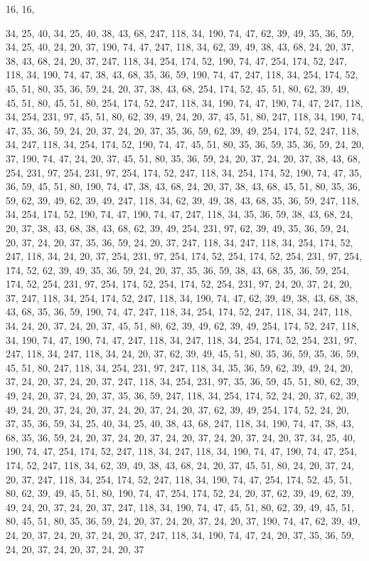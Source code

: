 16, 16,

34, 25, 40, 34, 25, 40, 38, 43, 68, 247, 118, 34, 190, 74, 47, 62,
39, 49, 35, 36, 59, 34, 25, 40, 24, 20, 37, 190, 74, 47, 247, 118,
34, 62, 39, 49, 38, 43, 68, 24, 20, 37, 38, 43, 68, 24, 20, 37,
247, 118, 34, 254, 174, 52, 190, 74, 47, 254, 174, 52, 247, 118, 34, 190,
74, 47, 38, 43, 68, 35, 36, 59, 190, 74, 47, 247, 118, 34, 254, 174,
52, 45, 51, 80, 35, 36, 59, 24, 20, 37, 38, 43, 68, 254, 174, 52,
45, 51, 80, 62, 39, 49, 45, 51, 80, 45, 51, 80, 254, 174, 52, 247,
118, 34, 190, 74, 47, 190, 74, 47, 247, 118, 34, 254, 231, 97, 45, 51,
80, 62, 39, 49, 24, 20, 37, 45, 51, 80, 247, 118, 34, 190, 74, 47,
35, 36, 59, 24, 20, 37, 24, 20, 37, 35, 36, 59, 62, 39, 49, 254,
174, 52, 247, 118, 34, 247, 118, 34, 254, 174, 52, 190, 74, 47, 45, 51,
80, 35, 36, 59, 35, 36, 59, 24, 20, 37, 190, 74, 47, 24, 20, 37,
45, 51, 80, 35, 36, 59, 24, 20, 37, 24, 20, 37, 38, 43, 68, 254,
231, 97, 254, 231, 97, 254, 174, 52, 247, 118, 34, 254, 174, 52, 190, 74,
47, 35, 36, 59, 45, 51, 80, 190, 74, 47, 38, 43, 68, 24, 20, 37,
38, 43, 68, 45, 51, 80, 35, 36, 59, 62, 39, 49, 62, 39, 49, 247,
118, 34, 62, 39, 49, 38, 43, 68, 35, 36, 59, 247, 118, 34, 254, 174,
52, 190, 74, 47, 190, 74, 47, 247, 118, 34, 35, 36, 59, 38, 43, 68,
24, 20, 37, 38, 43, 68, 38, 43, 68, 62, 39, 49, 254, 231, 97, 62,
39, 49, 35, 36, 59, 24, 20, 37, 24, 20, 37, 35, 36, 59, 24, 20,
37, 247, 118, 34, 247, 118, 34, 254, 174, 52, 247, 118, 34, 24, 20, 37,
254, 231, 97, 254, 174, 52, 254, 174, 52, 254, 231, 97, 254, 174, 52, 62,
39, 49, 35, 36, 59, 24, 20, 37, 35, 36, 59, 38, 43, 68, 35, 36,
59, 254, 174, 52, 254, 231, 97, 254, 174, 52, 254, 174, 52, 254, 231, 97,
24, 20, 37, 24, 20, 37, 247, 118, 34, 254, 174, 52, 247, 118, 34, 190,
74, 47, 62, 39, 49, 38, 43, 68, 38, 43, 68, 35, 36, 59, 190, 74,
47, 247, 118, 34, 254, 174, 52, 247, 118, 34, 247, 118, 34, 24, 20, 37,
24, 20, 37, 45, 51, 80, 62, 39, 49, 62, 39, 49, 254, 174, 52, 247,
118, 34, 190, 74, 47, 190, 74, 47, 247, 118, 34, 247, 118, 34, 254, 174,
52, 254, 231, 97, 247, 118, 34, 247, 118, 34, 24, 20, 37, 62, 39, 49,
45, 51, 80, 35, 36, 59, 35, 36, 59, 45, 51, 80, 247, 118, 34, 254,
231, 97, 247, 118, 34, 35, 36, 59, 62, 39, 49, 24, 20, 37, 24, 20,
37, 24, 20, 37, 247, 118, 34, 254, 231, 97, 35, 36, 59, 45, 51, 80,
62, 39, 49, 24, 20, 37, 24, 20, 37, 35, 36, 59, 247, 118, 34, 254,
174, 52, 24, 20, 37, 62, 39, 49, 24, 20, 37, 24, 20, 37, 24, 20,
37, 24, 20, 37, 62, 39, 49, 254, 174, 52, 24, 20, 37, 35, 36, 59,
34, 25, 40, 34, 25, 40, 38, 43, 68, 247, 118, 34, 190, 74, 47, 38,
43, 68, 35, 36, 59, 24, 20, 37, 24, 20, 37, 24, 20, 37, 24, 20,
37, 24, 20, 37, 34, 25, 40, 190, 74, 47, 254, 174, 52, 247, 118, 34,
247, 118, 34, 190, 74, 47, 190, 74, 47, 254, 174, 52, 247, 118, 34, 62,
39, 49, 38, 43, 68, 24, 20, 37, 45, 51, 80, 24, 20, 37, 24, 20,
37, 247, 118, 34, 254, 174, 52, 247, 118, 34, 190, 74, 47, 254, 174, 52,
45, 51, 80, 62, 39, 49, 45, 51, 80, 190, 74, 47, 254, 174, 52, 24,
20, 37, 62, 39, 49, 62, 39, 49, 24, 20, 37, 24, 20, 37, 247, 118,
34, 190, 74, 47, 45, 51, 80, 62, 39, 49, 45, 51, 80, 45, 51, 80,
35, 36, 59, 24, 20, 37, 24, 20, 37, 24, 20, 37, 190, 74, 47, 62,
39, 49, 24, 20, 37, 24, 20, 37, 24, 20, 37, 247, 118, 34, 190, 74,
47, 24, 20, 37, 35, 36, 59, 24, 20, 37, 24, 20, 37, 24, 20, 37

